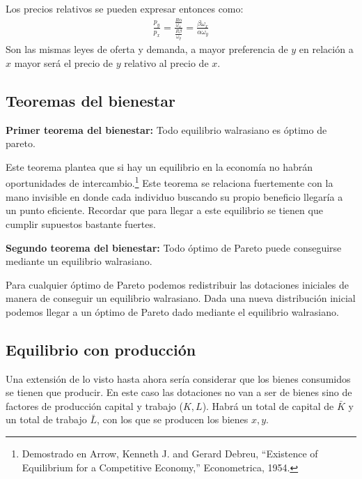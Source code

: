 Los precios relativos se pueden expresar entonces como:
\begin{align*}
    \frac{p_y}{p_x} = \frac{ \frac{R\alpha}{\omega_x}  }{  \frac{R\beta}{\omega_y}  } = \frac{\beta \omega_x}{\alpha \omega_y}
\end{align*}
Son las mismas leyes de oferta y demanda, a mayor preferencia de $y$ en relación a $x$ mayor será el precio de $y$ relativo al precio de $x$. 

\subsection{Teoremas del bienestar}

\textbf{Primer teorema del bienestar:} Todo equilibrio walrasiano es óptimo de pareto.

Este teorema plantea que si hay un equilibrio en la economía no habrán oportunidades de intercambio.\footnote{Demostrado en Arrow, Kenneth J. and Gerard Debreu, “Existence of Equilibrium for a Competitive Economy,” Econometrica, 1954.} Este teorema se relaciona fuertemente con la mano invisible en donde cada individuo buscando su propio beneficio llegaría a un punto eficiente. Recordar que para llegar a este equilibrio se tienen que cumplir supuestos bastante fuertes. 

\textbf{Segundo teorema del bienestar:} Todo óptimo de Pareto puede conseguirse mediante un equilibrio walrasiano. 

Para cualquier óptimo de Pareto podemos redistribuir las dotaciones iniciales de manera de conseguir un equilibrio walrasiano. Dada una nueva distribución inicial podemos llegar a un óptimo de Pareto dado mediante el equilibrio walrasiano. 

\subsection{Equilibrio con producción}

Una extensión de lo visto hasta ahora sería considerar que los bienes consumidos se tienen que producir. En este caso las dotaciones no van a ser de bienes sino de factores de producción capital y trabajo ($K,L$). Habrá un total de capital de $\bar{K}$ y un total de trabajo $\bar{L}$, con los que se producen los bienes $x,y$. 

